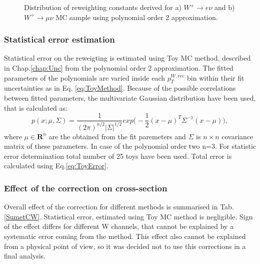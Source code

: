 \begin{figure}[!tbp]
\begin{minipage}[h]{0.49\linewidth}
\end{minipage}
\hfill
\begin{minipage}[h]{0.49\linewidth}
\end{minipage}
\caption{Distribution of \sumet reweighting constants derived for a) $W^{+} \to e \nu$ and b) $W^{+} \to \mu \nu$ MC sample using polynomial order 2 approximation.}
\label{ris:SumEtCorPol}
\end{figure}

\subsubsection{Statistical error estimation}

Statistical error on the \sumet reweigting is estimated using Toy MC method, described in Chap.\ref{chap:Unc} from the polynomial order 2 approximation. The fitted parameters of the polynomials are varied inside each $p_T^{W, rec}$ bin within their fit uncertainties as in Eq. \ref{eq:ToyMethod}. Because of the possible correlations between fitted parameters, the multivariate Gaussian distribution have been used, that is calculated as:
\begin{equation}
p(x;\mu, \Sigma) =\frac{1}{(2\pi)^{n/2}|\Sigma|^{1/2}} exp\Big(-\frac{1}{2}(x-\mu)^{T}\Sigma^{-1}(x-\mu)\Big),
\end{equation}
where $\mu\in \boldsymbol{R}^{n}$ are the obtained from the fit paremeters and $\Sigma$ is $n \times n$ covariance matrix of these parameters. In case of the polynomial order two n=3. For statistic error determination total number of 25 toys have been used. Total error is calculated using Eq.\ref{eq:ToyError}.

\subsubsection{Effect of the \sumet correction on cross-section}

Overall effect of the \sumet correction for different methods is summarised in Tab. \ref{SumetCW}. Statistical error, estimated using Toy MC method is negligible.  Sign of the effect differs for different W channels, that cannot be explained by a systematic error coming from the method. This effect also cannot be explained from a physical point of view, so it was decided not to use this corrections in a final analysis.

